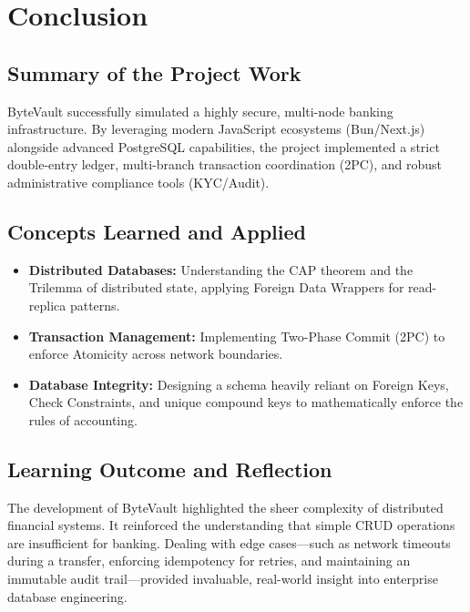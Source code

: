 \chapter{Conclusion}

\section{Summary of the Project Work}
ByteVault successfully simulated a highly secure, multi-node banking infrastructure. By leveraging modern JavaScript ecosystems (Bun/Next.js) alongside advanced PostgreSQL capabilities, the project implemented a strict double-entry ledger, multi-branch transaction coordination (2PC), and robust administrative compliance tools (KYC/Audit).

\section{Concepts Learned and Applied}
\begin{itemize}
    \item \textbf{Distributed Databases:} Understanding the CAP theorem and the Trilemma of distributed state, applying Foreign Data Wrappers for read-replica patterns.
    \item \textbf{Transaction Management:} Implementing Two-Phase Commit (2PC) to enforce Atomicity across network boundaries.
    \item \textbf{Database Integrity:} Designing a schema heavily reliant on Foreign Keys, Check Constraints, and unique compound keys to mathematically enforce the rules of accounting.
\end{itemize}

\section{Learning Outcome and Reflection}
The development of ByteVault highlighted the sheer complexity of distributed financial systems. It reinforced the understanding that simple CRUD operations are insufficient for banking. Dealing with edge cases---such as network timeouts during a transfer, enforcing idempotency for retries, and maintaining an immutable audit trail---provided invaluable, real-world insight into enterprise database engineering.
